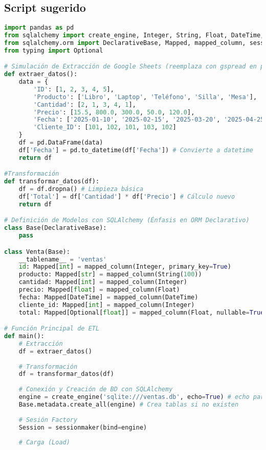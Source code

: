 \documentclass[12pt,a4paper]{article}
\begin{document}
\subsection*{Script sugerido}
\begin{lstlisting}[language=Python, caption={ETL con SQLAlchemy}]
import pandas as pd
from sqlalchemy import create_engine, Integer, String, Float, DateTime, func
from sqlalchemy.orm import DeclarativeBase, Mapped, mapped_column, sessionmaker
from typing import Optional

# Simulación de Extracción de Google Sheets (reemplaza con gspread en producción)
def extraer_datos():
    data = {
        'ID': [1, 2, 3, 4, 5],
        'Producto': ['Libro', 'Laptop', 'Teléfono', 'Silla', 'Mesa'],
        'Cantidad': [2, 1, 3, 4, 1],
        'Precio': [15.5, 800.0, 300.0, 50.0, 120.0],
        'Fecha': ['2025-01-10', '2025-02-15', '2025-03-20', '2025-04-25', '2025-05-30'],
        'Cliente_ID': [101, 102, 101, 103, 102]
    }
    df = pd.DataFrame(data)
    df['Fecha'] = pd.to_datetime(df['Fecha']) # Convierte a datetime
    return df

#Transformación
def transformar_datos(df):
    df = df.dropna() # Limpieza básica
    df['Total'] = df['Cantidad'] * df['Precio'] # Cálculo nuevo
    return df

# Definición de Modelos con SQLAlchemy (Énfasis en ORM Declarativo)
class Base(DeclarativeBase):
    pass

class Venta(Base):
    __tablename__ = 'ventas'
    id: Mapped[int] = mapped_column(Integer, primary_key=True)
    producto: Mapped[str] = mapped_column(String(100))
    cantidad: Mapped[int] = mapped_column(Integer)
    precio: Mapped[float] = mapped_column(Float)
    fecha: Mapped[DateTime] = mapped_column(DateTime)
    cliente_id: Mapped[int] = mapped_column(Integer)
    total: Mapped[Optional[float]] = mapped_column(Float, nullable=True)

# Función Principal de ETL
def main():
    # Extracción
    df = extraer_datos()
	
    # Transformación
    df = transformar_datos(df)
	
    # Conexión y Creación de BD con SQLAlchemy
    engine = create_engine('sqlite:///ventas.db', echo=True) # echo para logging
    Base.metadata.create_all(engine) # Crea tablas si no existen
    
    # Sesión Factory
    Session = sessionmaker(bind=engine)
    
    # Carga (Load)
    

\end{lstlisting}
\end{document}
